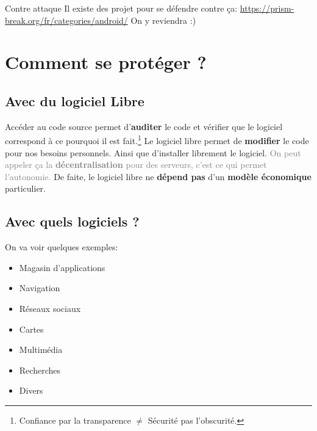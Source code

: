 \documentclass[aspectratio=169]{beamer}
\begin{document}
\begin{frame}{Contre attaque}
Il existe des projet pour se défendre contre ça:
\url{https://prism-break.org/fr/categories/android/}\newline
\newline
On y reviendra :)
\end{frame}



\section{Comment se protéger ?}

\begin{frame}
\begin{center}
\huge{\color{cvp}{Comment se protéger ?}}
\end{center}
\end{frame}

\subsection{Avec du logiciel Libre}

\begin{frame}
Accéder au code source permet d'\textbf{auditer} le code et vérifier que le logiciel correspond à ce pourquoi il est fait.\footnote{Confiance par la transparence $ \neq $ Sécurité pas l'obscurité.} \newline
\newline
Le logiciel libre permet de \textbf{modifier} le code pour nos besoins personnels.\newline
\newline
Ainsi que d'installer librement le logiciel.\newline
\textcolor{gray}{\tiny{On peut appeler ça la \textbf{décentralisation} pour des serveurs, c'est ce qui permet l'autonomie.}}\newline
\newline
De faite, le logiciel libre ne \textbf{dépend pas} d'un \textbf{modèle économique} particulier.
\end{frame}

\subsection{Avec quels logiciels ?}

\begin{frame}
On va voir quelques exemples:\newline
\begin{itemize}
	\item Magasin d'applications
	\item Navigation
	\item Réseaux sociaux
	\item Cartes
	\item Multimédia
	\item Recherches
	\item Divers
\end{itemize}
\end{frame}
\end{document}
